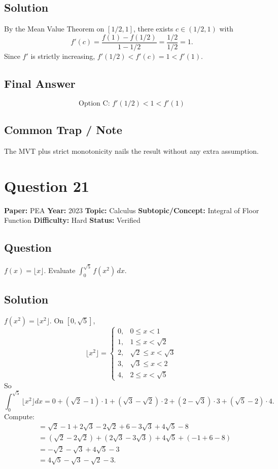 \documentclass[11pt]{article}
\begin{document}
\subsection*{Solution}
By the Mean Value Theorem on $[1/2,1]$, there exists $c\in(1/2,1)$ with
\[
f'(c)=\frac{f(1)-f(1/2)}{1-1/2}=\frac{1/2}{1/2}=1.
\]
Since $f'$ is strictly increasing, $f'(1/2)<f'(c)=1<f'(1)$.

\subsection*{Final Answer}
\[
\boxed{\text{Option C: } f'(1/2)<1<f'(1)}
\]

\subsection*{Common Trap / Note}
The MVT plus strict monotonicity nails the result without any extra assumption.

\medskip

\section*{Question 21}
\textbf{Paper:} PEA \quad \textbf{Year:} 2023 \quad \textbf{Topic:} Calculus \quad \textbf{Subtopic/Concept:} Integral of Floor Function \quad \textbf{Difficulty:} Hard \quad \textbf{Status:} Verified

\subsection*{Question}
$f(x)=\lfloor x\rfloor$. Evaluate $\displaystyle\int_0^{\sqrt 5}f(x^2)\,dx$.

\subsection*{Solution}
$f(x^2)=\lfloor x^2\rfloor$. On $[0,\sqrt 5]$,
\[
\lfloor x^2\rfloor=\begin{cases}0,& 0\le x<1\\ 1,& 1\le x<\sqrt 2\\ 2,& \sqrt 2\le x<\sqrt 3\\ 3,& \sqrt 3\le x<2\\ 4,& 2\le x<\sqrt 5\end{cases}
\]
So
\[
\int_0^{\sqrt 5}\lfloor x^2\rfloor dx=0+(\sqrt 2-1)\cdot 1+(\sqrt 3-\sqrt 2)\cdot 2+(2-\sqrt 3)\cdot 3+(\sqrt 5-2)\cdot 4.
\]
Compute:
\begin{align*}
&=\sqrt 2-1+2\sqrt 3-2\sqrt 2+6-3\sqrt 3+4\sqrt 5-8\\
&=(\sqrt 2-2\sqrt 2)+(2\sqrt 3-3\sqrt 3)+4\sqrt 5+(-1+6-8)\\
&=-\sqrt 2-\sqrt 3+4\sqrt 5-3\\
&=4\sqrt 5-\sqrt 3-\sqrt 2-3.
\end{align*}
\end{document}
